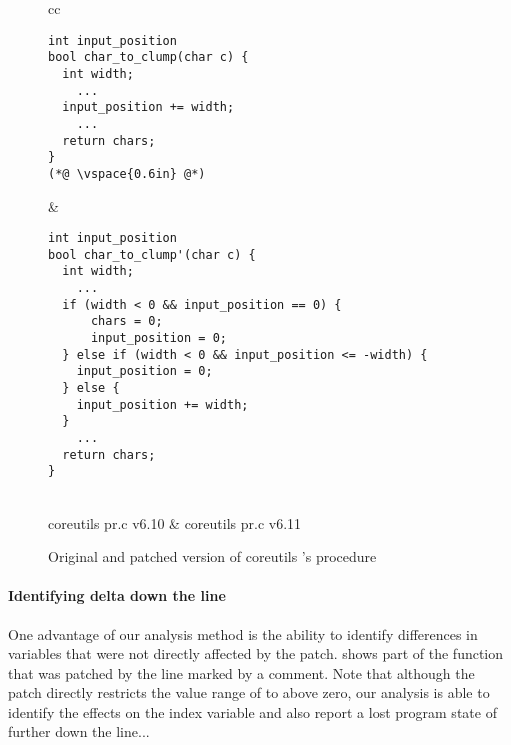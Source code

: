 \begin{figure*}
\centering
\begin{tabular}{cc}
\begin{lstlisting}
int input_position
bool char_to_clump(char c) {
  int width;
    ...
  input_position += width;
    ...
  return chars;
}
(*@ \vspace{0.6in} @*)
\end{lstlisting}
\hspace{1.0in}
&
\begin{lstlisting}
int input_position
bool char_to_clump'(char c) {
  int width;
    ...
  if (width < 0 && input_position == 0) {
      chars = 0;
      input_position = 0;
  } else if (width < 0 && input_position <= -width) {
    input_position = 0;
  } else {
    input_position += width;
  }
    ...
  return chars;
}
\end{lstlisting}
\\
coreutils pr.c v6.10 & coreutils pr.c v6.11
\end{tabular}
\caption{Original and patched version of coreutils 's  procedure}
\end{figure*}

\paragraph{Identifying delta down the line}
One advantage of our analysis method is the ability to identify differences in variables that were not directly affected by the patch.  shows part of the  function that was patched by the line marked by a comment. Note that although the patch directly restricts the value range of  to above zero, our analysis is able to identify the effects on the index variable  and also report a lost program state of  further down the line...

